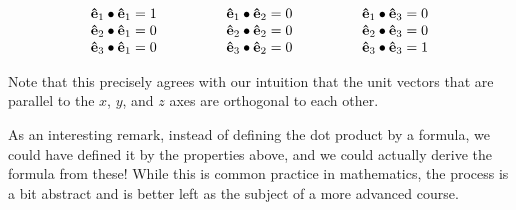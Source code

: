 \documentclass{ximera}
\begin{document}
\[
\begin{array}{lll}
\mathbf{\hat{e}}_1 \bullet \mathbf{\hat{e}}_1 = 1 \qquad \qquad & \mathbf{\hat{e}}_1 \bullet \mathbf{\hat{e}}_2 = 0 \qquad \qquad & \mathbf{\hat{e}}_1 \bullet \mathbf{\hat{e}}_3 = 0 \\
\mathbf{\hat{e}}_2 \bullet \mathbf{\hat{e}}_1 = 0 & \mathbf{\hat{e}}_2 \bullet \mathbf{\hat{e}}_2 = 0 & \mathbf{\hat{e}}_2 \bullet \mathbf{\hat{e}}_3 = 0 \\
\mathbf{\hat{e}}_3 \bullet \mathbf{\hat{e}}_1 = 0 & \mathbf{\hat{e}}_3 \bullet \mathbf{\hat{e}}_2 = 0 & \mathbf{\hat{e}}_3 \bullet \mathbf{\hat{e}}_3 = 1
\end{array}
\]

Note that this precisely agrees with our intuition that the unit vectors that are parallel to the $x$, $y$, and $z$ axes are orthogonal to each other.

As an interesting remark, instead of defining the dot product by a formula, we could have
defined it by the properties above, and we could actually derive the formula from these!  While this is common practice in
mathematics, the process is a bit abstract and is better left as the subject of a more advanced course.

\end{document}
